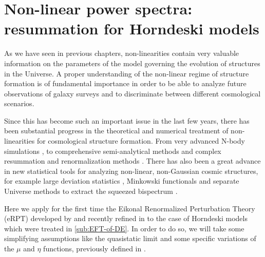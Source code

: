 \chapter{Non-linear power spectra: resummation for Horndeski models \label{chap:nonlinear}} %





As we have seen in previous chapters, non-linearities contain very valuable information
on the parameters of the model governing the evolution of structures in the Universe.
A proper understanding of the non-linear regime of structure formation is of fundamental 
importance in order to be able to analyze future observations of galaxy surveys and 
to discriminate between different cosmological scenarios.

Since this has become such an important issue in the last few years, there has been 
substantial progress in the theoretical and numerical
treatment of non-linearities for cosmological structure formation. 
From very advanced N-body simulations
\cite{vogelsberger_introducing_2014, kim2011new, baldi2014cosmic, winther2015fast, adamek2016gevolution, tassev2013solving}, to
comprehensive semi-analytical methods \cite{smith_stable_2003, mead_rapid_2014, heitmann_coyote_2014, 
agarwal_pkann_2012} and complex resummation and renormalization methods \cite{crocce_mptbreeze:_2012, crocce_renormalized_2006-8, blas_time-sliced_2015,blas_time-sliced_2016, pietroni_coarse-grained_2011,pietroni_flowing_2008,peloso_galilean_2016,matarrese_resumming_2007,anselmi_nonlinear_2012,anselmi_next--leading_2010, senatore_ir-resummed_2014-1,carrasco_effective_2012, taruya_regularized_2014, bernardeau_constructing_2012}. There has also been a great advance in
new statistical tools for analyzing non-linear, non-Gaussian cosmic structures, for example
large deviation statistics \cite{uhlemann_two_2016}, 
Minkowski functionals \cite{novaes_local_2016} and separate Universe methods to extract
the squeezed bispectrum \cite{Chiang:2014oga}.

Here we apply for the first time the Eikonal Renormalized Perturbation Theory (eRPT) developed
by \cite{anselmi_nonlinear_2012, anselmi_next--leading_2010} and recently refined in \cite{peloso_galilean_2016} to the 
case of Horndeski models which were treated in \cref{sub:EFT-of-DE}.
In order to do so, we will take some simplifying assumptions like the quasistatic limit and
some specific variations of the $\mu$ and $\eta$ functions, previously
defined in .

